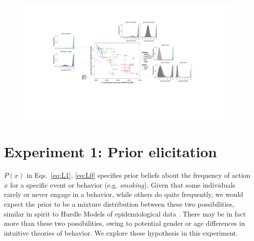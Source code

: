 \documentclass[10pt,letterpaper]{article}
\begin{document}

\begin{figure}[t]
\centering
  \includegraphics[width=\textwidth]{prior-scatter-insets}
  \caption{}
  \label{fig:priorScatter}
\end{figure}
%


\section{Experiment 1: Prior elicitation}

%
$P(x)$ in Eqs.~\ref{eq:L1}, \ref{eq:L0} specifies prior beliefs about the frequency of action $x$ for a specific event or behavior (e.g. \emph{smoking}).
Given that some individuals rarely or never engage in a behavior, while others do quite frequently, we would expect the prior to be a mixture distribution between these two possibilities, similar in spirit to Hurdle Models of epidemiological data \cite{hurdleModels}.
There may be in fact more than these two possibilities, owing to potential gender or age differences in intuitive theories of behavior. 
We explore these hypothesis in this experiment.
\end{document}
